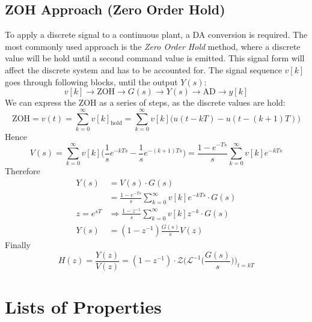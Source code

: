 \documentclass[10pt,a4paper]{article}
\begin{document}
\subsection{ZOH Approach (Zero Order Hold)}
To apply a discrete signal to a continuous plant, a DA conversion is required. The most commonly used approach is the \emph{Zero Order Hold} method, where a discrete value will be hold until a second command value is emitted. This signal form will affect the discrete system and has to be accounted for. The signal sequence $v[k]$ goes through following blocks, until the output $Y(s)$: 
$$
v[k] \longrightarrow \text{ZOH} \longrightarrow G(s) \longrightarrow Y(s) \longrightarrow \text{AD} \longrightarrow y[k]
$$ 
We can express the ZOH as a series of steps, as the discrete values are hold:
$$
\text{ZOH} = v(t) = \sum_{k=0}^{\infty} v[k]_{\text{hold}} = \sum_{k=0}^{\infty} v[k]\Big( u(t-kT)-u(t-(k+1)T) \Big) 
$$
Hence
$$
V(s) = \sum_{k=0}^{\infty} v[k] \Big(\frac{1}{s}e^{-kTs} - \frac{1}{s}e^{-(k+1)Ts} \Big)
	 = \frac{1 - e^{-Ts}}{s} \sum_{k=0}^{\infty} v[k]e^{-kTs}
$$
Therefore
\begin{align*}
Y(s) &=  V(s) \cdot G(s) \\
  	 &= \frac{1 - e^{-Ts}}{s} \sum_{k=0}^{\infty} v[k]e^{-kTs} \cdot G(s) \\
  	 z = e^{sT} &\Rightarrow \frac{1 - z^{-1}}{s} \sum_{k=0}^{\infty} v[k]z^{-k} \cdot G(s) \\
Y(s) &= (1 - z^{-1})\frac{G(s)}{s} V(z)
\end{align*}
Finally
$$
\boxed{
H(z) = \frac{Y(z)}{V(z)} = (1-z^{-1})\cdot \mathcal{Z} \Big( \mathcal{L}^{-1}\Big( \frac{G(s)}{s} \Big) \Big)_{t = kT}
}
$$

\newpage
\section{Lists of Properties}
\end{document}
